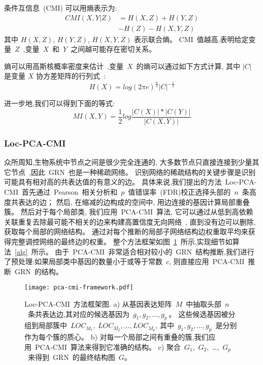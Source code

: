 条件互信息~(CMI) 可以用熵表示为:
\begin{equation}
\begin{split}
CMI(X,Y|Z) &= H(X,Z) + H(Y,Z)\\
               & - H(Z) - H(X,Y,Z)
\end{split}
\end{equation}
其中 $H(X,Z)$, $H(Y,Z)$, $H(X,Y,Z)$ 表示联合熵。
CMI~值越高,表明给定变量~$Z$~,变量~$X$~和~$Y$~之间越可能存在密切关系。

熵可以用高斯核概率密度来估计~\cite{basso2005reverse},变量~$X$~的熵可以通过如下方式计算, 
其中 $|C|$ 是变量 $X$ 协方差矩阵的行列式~\cite{zhang2011inferring}:
\begin{equation}
    H(X) = log(2\pi e )^\frac{n}{2} |C| ^ {-\frac{1}{2}}
\end{equation}

进一步地,我们可以得到下面的等式:
\begin{equation}
    MI(X,Y)=\frac{1}{2}log\frac{|C(X)|*|C(Y)|}{|C(X,Y)|}
\end{equation}

\subsubsection{Loc-PCA-CMI}
众所周知,生物系统中节点之间是很少完全连通的,
大多数节点只直接连接到少量其它节点~\cite{jeong2000large},因此~GRN~也是一种稀疏网络。
识别网络的稀疏结构的关键步骤是识别可能具有相对高的共表达值的有意义的边。
具体来说,我们提出的方法~Loc-PCA-CMI~首先通过~Pearson~相关分析和~$p$~值错误率~(FDR)校正选择头部的~$n$~条高度共表达的边；
然后, 在缩减的边构成的空间中, 用边连接的基因计算局部重叠簇。
然后对于每个局部类, 我们应用~PCA-CMI~算法,
它可以通过从低到高依赖关联重复去除最可能不相关的边来构建高置信度无向网络~\cite{spirtes2000causation},
直到没有边可以删除,获取每个局部的网络结构。
通过对每个推断的局部子网络结构边权重取平均来获得完整调控网络的最终边的权重。
整个方法框架如图~\ref{pca-cmi-fr}~所示,实现细节如算法~\ref{alg}~所示。
由于~PCA-CMI~非常适合相对较小的~GRN~结构推断,我们进行了预处理:如果局部类中基因的数量小于或等于常数~$c$,
则直接应用~PCA-CMI~推断~GRN~的结构。
\begin{figure}[!htbp]
    \centering
    \texttt{[image: pca-cmi-framework.pdf]}
    \caption{Loc-PCA-CMI~方法框架图.
     a) 从基因表达矩阵~$M$~中抽取头部~$n$~条共表达边,其对应的候选基因为~$g_1,g_2,\ldots,g_{p}~$。
    这些候选基因被分组到局部簇中~$LOC_{M_1},~LOC_{M_2},\ldots,LOC_{M_{p}}$,
    其中~$g_1,g_2,\ldots,g_{p}$~是分别作为每个簇的质心。
    b) 对每一个局部之间有重叠的簇,我们应用~PCA-CMI~算法来得到它准确的结构。
    c) 聚合~$G_1$,~$G_2$,~\ldots,~$G_p$~来得到~GRN~的最终结构图~$G$。
    }
    \label{pca-cmi-fr}
\end{figure}

